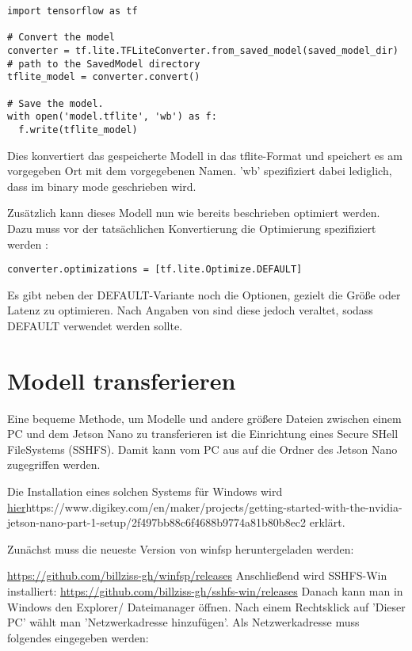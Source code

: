 \begin{verbatim}
import tensorflow as tf

# Convert the model
converter = tf.lite.TFLiteConverter.from_saved_model(saved_model_dir) # path to the SavedModel directory
tflite_model = converter.convert()

# Save the model.
with open('model.tflite', 'wb') as f:
  f.write(tflite_model)
\end{verbatim}

Dies konvertiert das gespeicherte Modell in das tflite-Format und speichert es am vorgegeben Ort mit dem vorgegebenen Namen. \cite{Google.04.11.2020}
'wb' spezifiziert dabei lediglich, dass im binary mode geschrieben wird.

Zusätzlich kann dieses Modell nun wie bereits beschrieben optimiert werden. Dazu muss vor der tatsächlichen Konvertierung die Optimierung spezifiziert werden 
\cite{Warden:2020}:

\begin{verbatim}
converter.optimizations = [tf.lite.Optimize.DEFAULT]
\end{verbatim}
Es gibt neben der DEFAULT-Variante noch die Optionen, gezielt die Größe oder Latenz zu optimieren.
Nach Angaben von \cite{Google.13.01.2021} sind diese jedoch veraltet, sodass DEFAULT verwendet werden sollte.

\section{Modell transferieren}
Eine bequeme Methode, um Modelle und andere größere Dateien zwischen einem PC und dem Jetson Nano zu transferieren ist die Einrichtung
eines Secure SHell FileSystems (SSHFS). Damit kann vom PC aus auf die Ordner des Jetson Nano zugegriffen werden.


Die Installation eines solchen Systems für Windows wird  \url{hier}{https://www.digikey.com/en/maker/projects/getting-started-with-the-nvidia-jetson-nano-part-1-setup/2f497bb88c6f4688b9774a81b80b8ec2}
erklärt. 

Zunächst muss die neueste Version von winfsp heruntergeladen werden:

\url{https://github.com/billziss-gh/winfsp/releases}
Anschließend wird SSHFS-Win installiert: 
\url{https://github.com/billziss-gh/sshfs-win/releases}
Danach kann man in Windows den Explorer/ Dateimanager öffnen. Nach einem Rechtsklick auf 'Dieser PC' wählt man 'Netzwerkadresse hinzufügen'.
Als Netzwerkadresse muss folgendes eingegeben werden:

